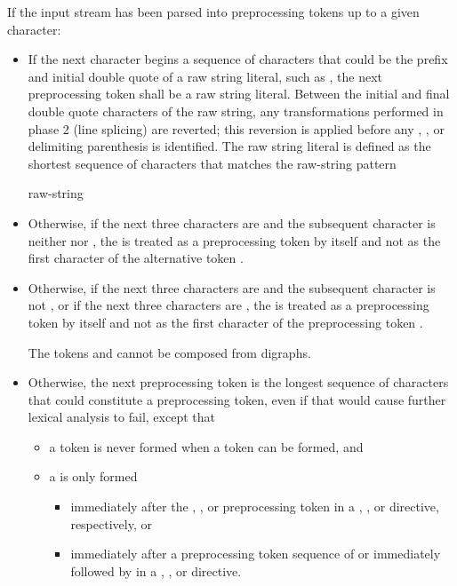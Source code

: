\pnum
If the input stream has been parsed into preprocessing tokens up to a
given character:
\begin{itemize}
\item
{}%
If the next character begins a sequence of characters that could be the prefix
and initial double quote of a raw string literal, such as , the next preprocessing
token shall be a raw string literal. Between the initial and final
double quote characters of the raw string, any transformations performed in phase
2 (line splicing) are reverted; this reversion
is applied before any , , or delimiting
parenthesis is identified. The raw string literal is defined as the shortest sequence
of characters that matches the raw-string pattern
\begin{ncbnf}
  raw-string
\end{ncbnf}

\item Otherwise, if the next three characters are \tcode{<::} and the subsequent character
is neither \tcode{:} nor \tcode{>}, the \tcode{<} is treated as a preprocessing token by
itself and not as the first character of the alternative token \tcode{<:}.

\item
Otherwise, if the next three characters are \tcode{[::} and
the subsequent character is not \tcode{:}, or
if the next three characters are \tcode{[:>},
the \tcode{[} is treated as a preprocessing token by itself and
not as the first character of the preprocessing token \tcode{[:}.
\begin{note}
The tokens \tcode{[:} and \tcode{:]} cannot be composed from digraphs.
\end{note}

\item Otherwise,
the next preprocessing token is the longest sequence of
characters that could constitute a preprocessing token, even if that
would cause further lexical analysis to fail,
except that
\begin{itemize}
\item
a  token is never formed
when a  token can be formed, and
\item
a  is only formed
\begin{itemize}
\item
immediately after the , , or  preprocessing token in a
, , or
 directive, respectively, or
\item
immediately after a preprocessing token sequence of 
or  immediately followed by \tcode{(}
in a , , or  directive.
\end{itemize}
\end{itemize}
\end{itemize}

